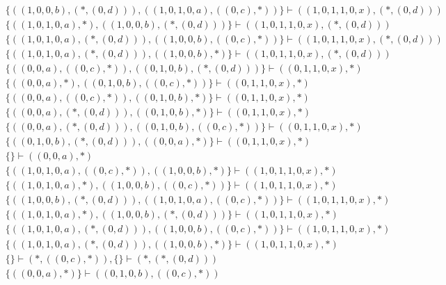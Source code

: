 \begin{align*}
	 & \qquad \{ ((1, 0, 0, b), (*, (0, d))), ((1, 0, 1, 0, a), ((0, c), *)) \} \vdash ((1, 0, 1, 1, 0, x), (*, (0, d))) \\ 
	 & \qquad \{ ((1, 0, 1, 0, a), *), ((1, 0, 0, b), (*, (0, d))) \} \vdash ((1, 0, 1, 1, 0, x), (*, (0, d))) \\ 
	 & \qquad \{ ((1, 0, 1, 0, a), (*, (0, d))), ((1, 0, 0, b), ((0, c), *)) \} \vdash ((1, 0, 1, 1, 0, x), (*, (0, d))) \\ 
	 & \qquad \{ ((1, 0, 1, 0, a), (*, (0, d))), ((1, 0, 0, b), *) \} \vdash ((1, 0, 1, 1, 0, x), (*, (0, d))) \\ 
	 & \qquad \{ ((0, 0, a), ((0, c), *)), ((0, 1, 0, b), (*, (0, d))) \} \vdash ((0, 1, 1, 0, x), *) \\ 
	 & \qquad \{ ((0, 0, a), *), ((0, 1, 0, b), ((0, c), *)) \} \vdash ((0, 1, 1, 0, x), *) \\ 
	 & \qquad \{ ((0, 0, a), ((0, c), *)), ((0, 1, 0, b), *) \} \vdash ((0, 1, 1, 0, x), *) \\ 
	 & \qquad \{ ((0, 0, a), (*, (0, d))), ((0, 1, 0, b), *) \} \vdash ((0, 1, 1, 0, x), *) \\ 
	 & \qquad \{ ((0, 0, a), (*, (0, d))), ((0, 1, 0, b), ((0, c), *)) \} \vdash ((0, 1, 1, 0, x), *) \\ 
	 & \qquad \{ ((0, 1, 0, b), (*, (0, d))), ((0, 0, a), *) \} \vdash ((0, 1, 1, 0, x), *) \\ 
	 & \qquad \{  \} \vdash ((0, 0, a), *) \\ 
	 & \qquad \{ ((1, 0, 1, 0, a), ((0, c), *)), ((1, 0, 0, b), *) \} \vdash ((1, 0, 1, 1, 0, x), *) \\ 
	 & \qquad \{ ((1, 0, 1, 0, a), *), ((1, 0, 0, b), ((0, c), *)) \} \vdash ((1, 0, 1, 1, 0, x), *) \\ 
	 & \qquad \{ ((1, 0, 0, b), (*, (0, d))), ((1, 0, 1, 0, a), ((0, c), *)) \} \vdash ((1, 0, 1, 1, 0, x), *) \\ 
	 & \qquad \{ ((1, 0, 1, 0, a), *), ((1, 0, 0, b), (*, (0, d))) \} \vdash ((1, 0, 1, 1, 0, x), *) \\ 
	 & \qquad \{ ((1, 0, 1, 0, a), (*, (0, d))), ((1, 0, 0, b), ((0, c), *)) \} \vdash ((1, 0, 1, 1, 0, x), *) \\ 
	 & \qquad \{ ((1, 0, 1, 0, a), (*, (0, d))), ((1, 0, 0, b), *) \} \vdash ((1, 0, 1, 1, 0, x), *) \\ 
	 & \qquad \{  \} \vdash (*, ((0, c), *)), \{  \} \vdash (*, (*, (0, d))) \\ 
	 & \qquad \{ ((0, 0, a), *) \} \vdash ((0, 1, 0, b), ((0, c), *)) \\ 

\end{align*}
